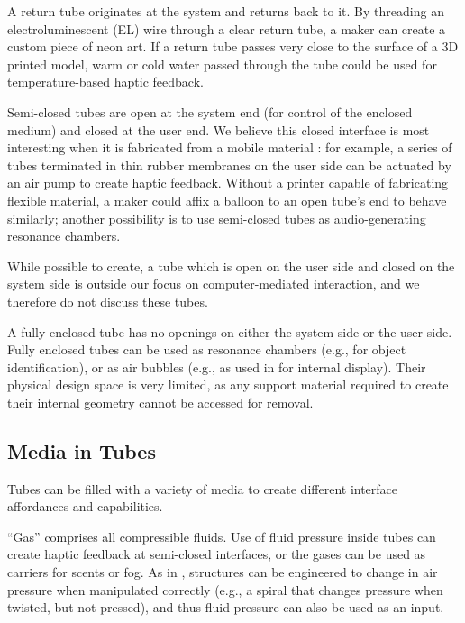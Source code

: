A return tube originates at the system and returns back to it.  By threading an electroluminescent (EL) wire through a clear return tube, a maker can create a custom piece of neon art.  If a return tube passes very close to the surface of a 3D printed model, warm or cold water passed through the tube could be used for temperature-based haptic feedback.

Semi-closed tubes are open at the system end (for control of the enclosed medium) and closed at the user end.  We believe  this closed interface is most interesting when it is fabricated from a mobile material : for example, a series of tubes terminated in thin rubber membranes on the user side can be actuated by an air pump to create haptic feedback.  Without a printer capable of fabricating flexible material, a maker could affix a balloon to an open tube's end to behave similarly; another possibility is to use semi-closed tubes as audio-generating resonance chambers.

While possible to create, a tube which is open on the user side and closed on the system side is outside our focus on computer-mediated interaction, and we therefore do not discuss these tubes. 

A fully enclosed tube has no openings on either the system side or the user side.  Fully enclosed tubes can be used as resonance chambers (e.g., for object identification), or as air bubbles (e.g., as used in \cite{Willis-printedoptics} for internal display).   Their physical design space is very limited, as any support material required to create their internal geometry cannot be accessed for removal.

\subsection{Media in Tubes}

Tubes can be filled with a variety of media to create different interface affordances and capabilities.

``Gas'' comprises all compressible fluids.  Use of fluid pressure inside tubes can create haptic feedback at semi-closed interfaces, or the gases can be used as carriers for scents or fog.  As in \cite{Slyper-pressure}, structures can be engineered to change in air pressure when manipulated correctly (e.g., a spiral that changes pressure when twisted, but not pressed), and thus fluid pressure can also be used as an input. 

